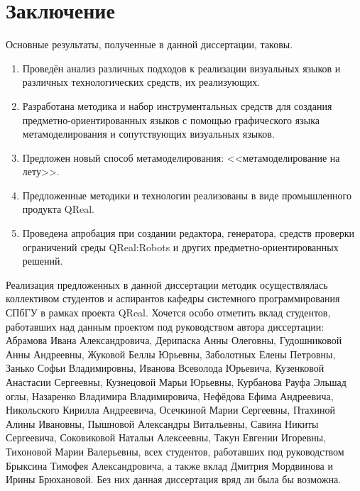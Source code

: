 \chapter*{Заключение}
Основные результаты, полученные в данной диссертации, таковы.
\begin{enumerate}
	\item Проведён анализ различных подходов к реализации визуальных языков и различных 
		технологических средств, их реализующих.
	\item Разработана методика и набор инструментальных средств для  создания предметно-ориентированных 
		языков с помощью графического языка метамоделирования и сопутствующих визуальных языков.
	\item Предложен новый способ метамоделирования: <<метамоделирование на лету>>.
	\item Предложенные методики и технологии реализованы в виде промышленного продукта QReal.
	\item Проведена апробация при создании редактора, генератора, средств проверки ограничений 
		среды QReal:Robots и других предметно-ориентированных решений.
\end{enumerate}

Реализация предложенных в данной диссертации методик осуществлялась коллективом студентов 
и аспирантов кафедры системного программирования СПбГУ в рамках проекта QReal. Хочется 
особо отметить вклад студентов, работавших над данным проектом под руководством автора 
диссертации: Абрамова Ивана Александровича, Дерипаска Анны Олеговны, Гудошниковой Анны Андреевны, 
Жуковой Беллы Юрьевны, Заболотных Елены Петровны, Занько Софьи Владимировны, Иванова Всеволода Юрьевича, 
Кузенковой Анастасии Сергеевны, Кузнецовой Марьи Юрьевны, Курбанова Рауфа Эльшад оглы, 
Назаренко Владимира Владимировича, Нефёдова Ефима Андреевича, Никольского Кирилла Андреевича, 
Осечкиной Марии Сергеевны, Птахиной Алины Ивановны, Пышновой Александры Витальевны, 
Савина Никиты Сергеевича, Соковиковой Натальи Алексеевны, Такун Евгении Игоревны, 
Тихоновой Марии Валерьевны, всех студентов, работавших под руководством Брыксина Тимофея Александровича, 
а также вклад Дмитрия Мордвинова и Ирины Брюхановой. Без них данная диссертация вряд ли 
была бы возможна.